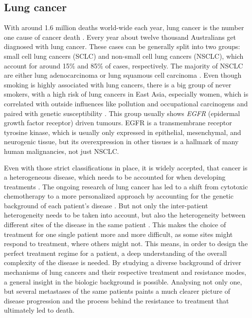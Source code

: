 \subsection{Lung cancer}
\label{intro-sec:lungcancer}

With around 1.6 million deaths world-wide each year, lung cancer is the number one cause of cancer death \cite{Siegel2018}. Every year about twelve thousand Australians get diagnosed with lung cancer. These cases can be generally split into two groups: small cell lung cancers (SCLC) and non-small cell lung cancers (NSCLC), which account for around 15\% and 85\% of cases, respectively. The majority of NSCLC are either lung adenocarcinoma or lung squamous cell carcinoma \cite{Molina2008}. Even though smoking is highly associated with lung cancers, there is a big group of never smokers, with a high risk of lung cancers in East Asia, especially women, which is correlated with outside influences like pollution and occupational carcinogens and paired with genetic susceptibility \cite{Sun2007}.
This group usually shows \textit{EGFR} (epidermal growth factor receptor) driven tumours. EGFR is a transmembrane receptor tyrosine kinase, which is usually only expressed in epithelial, mesenchymal, and neurogenic tissue, but its overexpression in other tissues is a hallmark of many human malignancies, not just NSCLC.

Even with those strict classifications in place, it is widely accepted, that cancer is a heterogeneous disease, which needs to be accounted for when developing treatments \cite{Suda2018}. The ongoing research of lung cancer has led to a shift from cytotoxic chemotherapy to a more personalized approach by accounting for the genetic background of each patient’s disease \cite{Lindeman2018}. 
But not only the inter-patient heterogeneity needs to be taken into account, but also the heterogeneity between different sites of the disease in the same patient \cite{Leong2018,Savas2016}. This makes the choice of treatment for one single patient more and more difficult, as some sites might respond to treatment, where others might not. This means, in order to design the perfect treatment regime for a patient, a deep understanding of the overall complexity of the disease is needed. By studying a diverse background of driver mechanisms of lung cancers and their respective treatment and resistance modes, a general insight in the biologic background is possible. Analysing not only one, but several metastases of the same patients paints a much clearer picture of disease progression and the process behind the resistance to treatment that ultimately led to death. 


